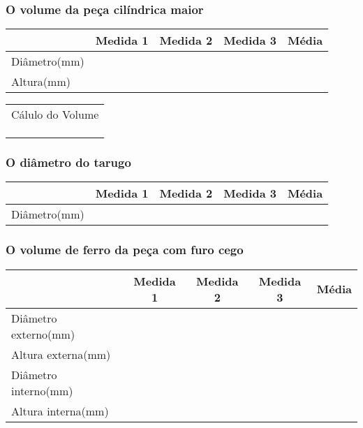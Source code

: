 \documentclass[10pt,a4paper,onecolumn,notitlepage]{scrartcl}
\begin{document}
\subsubsection{O volume da peça cilíndrica maior} 
\begin{table}[!ht]
\centering
\begin{tabular}{|l|*{4}{c|}}
\hline & Medida 1& Medida 2& Medida 3& Média \\
\hline Diâmetro(mm)& & &  & \\ 
\hline Altura(mm)& & &  & \\ 
\hline
\end{tabular}

\end{table}

\begin{table}[!ht]
\centering
\begin{tabular}{|p{10cm}|}
\hline Cálulo do Volume \\ 
\\
\\
\\
\hline
\end{tabular}
\end{table}

\subsubsection{O diâmetro do tarugo} 
\begin{table}[H]
\centering
\begin{tabular}{|l|*{4}{c|}}
\hline & Medida 1& Medida 2& Medida 3& Média \\
\hline Diâmetro(mm)& & &  & \\ 
\hline
\end{tabular}

\end{table}

\subsubsection{O volume de ferro da peça com furo cego} 

\begin{table}[!ht]
\centering
\begin{tabular}{|l|*{4}{c|}}
\hline & Medida 1& Medida 2& Medida 3& Média \\
\hline Diâmetro externo(mm)& & &  & \\ 
\hline Altura externa(mm)& & &  & \\ 
\hline Diâmetro interno(mm)& & &  & \\ 
\hline Altura interna(mm)& & &  & \\ 
\hline
\end{tabular}

\end{table}
\end{document}

